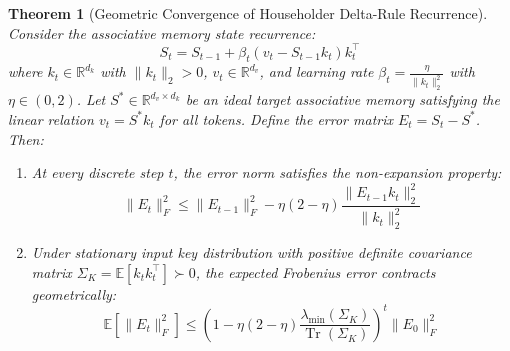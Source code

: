 \documentclass{article}
\newtheorem{theorem}{Theorem}
\begin{document}
\begin{theorem}[Geometric Convergence of Householder Delta-Rule Recurrence]
\label{thm:delta_rule_contraction}
Consider the associative memory state recurrence:
\begin{equation}
    S_t = S_{t-1} + \beta_t (v_t - S_{t-1} k_t) k_t^\top
\end{equation}
where $k_t \in \mathbb{R}^{d_k}$ with $\|k_t\|_2 > 0$, $v_t \in \mathbb{R}^{d_v}$, and learning rate $\beta_t = \frac{\eta}{\|k_t\|_2^2}$ with $\eta \in (0, 2)$. Let $S^* \in \mathbb{R}^{d_v \times d_k}$ be an ideal target associative memory satisfying the linear relation $v_t = S^* k_t$ for all tokens. Define the error matrix $E_t = S_t - S^*$. Then:
\begin{enumerate}
    \item At every discrete step $t$, the error norm satisfies the non-expansion property:
    \begin{equation}
        \|E_t\|_F^2 \le \|E_{t-1}\|_F^2 - \eta(2 - \eta) \frac{\|E_{t-1} k_t\|_2^2}{\|k_t\|_2^2}
    \end{equation}
    \item Under stationary input key distribution with positive definite covariance matrix $\Sigma_K = \mathbb{E}[k_t k_t^\top] \succ 0$, the expected Frobenius error contracts geometrically:
    \begin{equation}
        \mathbb{E}[\|E_t\|_F^2] \le \left( 1 - \eta(2 - \eta) \frac{\lambda_{\min}(\Sigma_K)}{\operatorname{Tr}(\Sigma_K)} \right)^t \|E_0\|_F^2
    \end{equation}
\end{enumerate}
\end{theorem}
\end{document}
